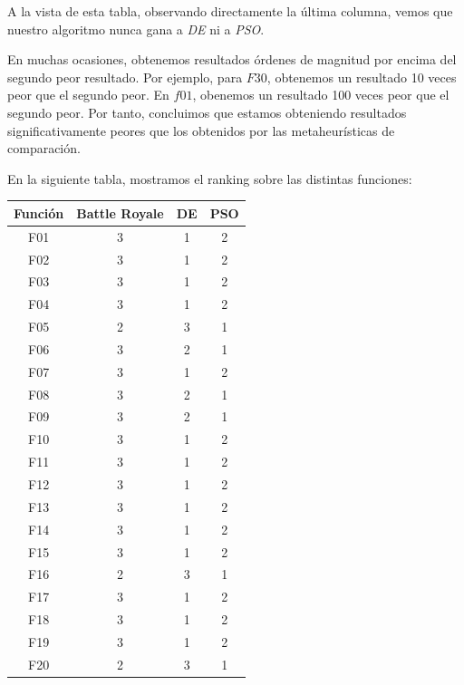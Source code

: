 \documentclass[11pt]{article}
\begin{document}
A la vista de esta tabla, observando directamente la última columna, vemos que nuestro algoritmo nunca gana a \emph{DE} ni a \emph{PSO}.

En muchas ocasiones, obtenemos resultados órdenes de magnitud por encima del segundo peor resultado. Por ejemplo, para $F30$, obtenemos un resultado 10 veces peor que el segundo peor. En $f01$, obenemos un resultado 100 veces peor que el segundo peor. Por tanto, concluimos que estamos obteniendo resultados significativamente peores que los obtenidos por las metaheurísticas de comparación.

En la siguiente tabla, mostramos el ranking sobre las distintas funciones:

\begin{table}[H]
\centering
\begin{tabular}{|c|c|c|c|}
\hline
\textbf{Función} & \textbf{Battle Royale} &         \textbf{DE} &        \textbf{PSO} \\
\hline
F01  &             3 &      1 &      2 \\
F02  &             3 &      1 &      2 \\
F03  &             3 &      1 &      2 \\
F04  &             3 &      1 &      2 \\
F05  &             2 &      3 &      1 \\
F06  &             3 &      2 &      1 \\
F07  &             3 &      1 &      2 \\
F08  &             3 &      2 &      1 \\
F09  &             3 &      2 &      1 \\
F10  &             3 &      1 &      2 \\
F11  &             3 &      1 &      2 \\
F12  &             3 &      1 &      2 \\
F13  &             3 &      1 &      2 \\
F14  &             3 &      1 &      2 \\
F15  &             3 &      1 &      2 \\
F16  &             2 &      3 &      1 \\
F17  &             3 &      1 &      2 \\
F18  &             3 &      1 &      2 \\
F19  &             3 &      1 &      2 \\
F20  &             2 &      3 &      1 \\

\end{tabular}
\end{table}
\end{document}
